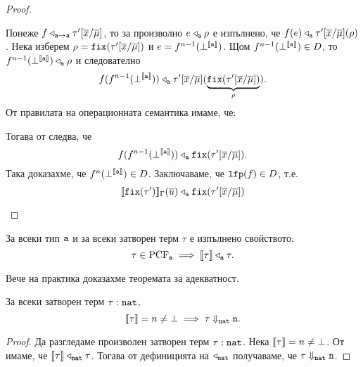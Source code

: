 \begin{proof}
\begin{itemize}
    Понеже $f \triangleleft_{\vv{a}\to\vv{a}} \tau'[\ov{x}/\ov{\mu}]$, то
    за произволно $e \triangleleft_{\vv{a}} \rho$ е изпълнено, че
    $f(e) \triangleleft_{\vv{a}} \tau'[\ov{x}/\ov{\mu}](\rho)$.
    Нека изберем $\rho = \fix(\tau'[\ov{x}/\ov{\mu}])$ и $e = f^{n-1}(\bot^{\val{\vv{a}}})$.
    Щом $f^{n-1}(\bot^{\val{\vv{a}}}) \in D$, то $f^{n-1}(\bot^{\val{\vv{a}}}) \triangleleft_{\vv{a}} \rho$ и следователно
    \[f(f^{n-1}(\bot^{\val{\vv{a}}})) \triangleleft_{\vv{a}} \tau'[\ov{x}/\ov{\mu}](\underbrace{\fix(\tau'[\ov{x}/\ov{\mu}])}_{\rho}).\]
    От правилата на операционната семантика имаме, че:
    \begin{prooftree}
    \end{prooftree}
    Тогава от  следва, че
    \[f(f^{n-1}(\bot^{\val{\vv{a}}})) \triangleleft_{\vv{a}} \fix(\tau'[\ov{x}/\ov{\mu}]).\]
    Така доказахме, че $f^n(\bot^{\val{\vv{a}}}) \in D$.
    Заключаваме, че $\lfp(f) \in D$, т.е.
    \[\val{\fix(\tau')}_\Gamma(\ov{u}) \triangleleft_{\vv{a}} \fix(\tau'[\ov{x}/\ov{\mu}])\]
  \end{itemize}
\end{proof}

\begin{corollary}\label{cr:pcf:fundamental}
  За всеки тип $\vv{a}$ и за всеки затворен терм $\tau$ е изпълнено свойството:
  \[\tau \in \text{PCF}_{\vv{a}} \implies \val{\tau} \triangleleft_{\vv{a}} \tau.\]
\end{corollary}

Вече на практика доказахме теоремата за адекватност.

\begin{framed}
  \begin{theorem}\label{th:pcf:adequacy}
    За всеки затворен терм $\tau : \vv{nat}$, 
    \[\val{\tau} = n \neq \bot \implies \tau \Downarrow_{\vv{nat}} \vv{n}.\]
  \end{theorem}
\end{framed}
\begin{proof}
  Да разгледаме произволен затворен терм $\tau : \vv{nat}$.
  Нека $\val{\tau} = n \neq \bot$.
  От  имаме, че $\val{\tau} \triangleleft_{\vv{nat}} \tau$.
  Тогава от дефиницията на $\triangleleft_{\vv{nat}}$ получаваме, че $\tau \Downarrow_{\vv{nat}} \vv{n}$.
\end{proof}

